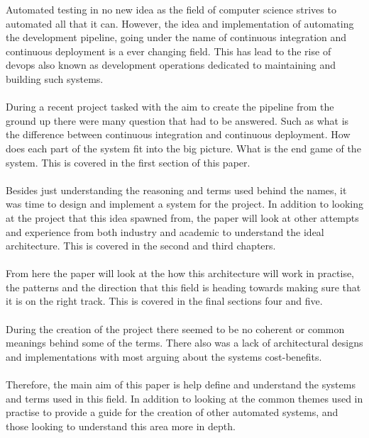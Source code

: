 Automated testing in no new idea as the field of computer science strives to automated all that it can. However, the idea and implementation of automating the development pipeline, going under the name of continuous integration and continuous deployment is a ever changing field. This has lead to the rise of devops also known as development operations dedicated to maintaining and building such systems.
\\\\
During a recent project tasked with the aim to create the pipeline from the ground up there were many question that had to be answered. Such as what is the difference between continuous integration and continuous deployment. How does each part of the system fit into the big picture. What is the end game of the system. This is covered in the first section of this paper.
\\\\
Besides just understanding the reasoning and terms used behind the names, it was time to design and implement a system for the project. In addition to looking at the project that this idea spawned from, the paper will look at other attempts and experience from both industry and academic to understand the ideal architecture. This is covered in the second and third chapters.
\\\\
From here the paper will look at the how this architecture will work in practise, the patterns and the direction that this field is heading towards making sure that it is on the right track. This is covered in the final sections four and five.
\\\\
During the creation of the project there seemed to be no coherent or common meanings behind some of the terms. There also was a lack of architectural designs and implementations with most arguing about the systems cost-benefits.
\\\\
Therefore, the main aim of this paper is help define and understand the systems and terms used in this field. In addition to looking at the common themes used in practise to provide a guide for the creation of other automated systems, and those looking to understand this area more in depth.
